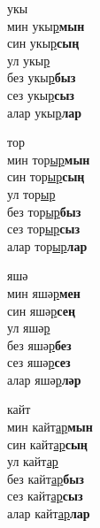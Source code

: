 \begin{multicols}{4}
\begin{enumerate}
\begin{minipage}{\linewidth}
    \item
    укы\\
    мин укы\underline{р}\textbf{мын}\\
    син укы\underline{р}\textbf{сың}\\
    ул укы\underline{р}\\
    без укы\underline{р}\textbf{быз}\\
    сез укы\underline{р}\textbf{сыз}\\
    алар укы\underline{р}\textbf{лар}\\
\end{minipage}

\begin{minipage}{\linewidth}
    \item
    тор\\
    мин тор\underline{ыр}\textbf{мын}\\
    син тор\underline{ыр}\textbf{сың}\\
    ул тор\underline{ыр}\\
    без тор\underline{ыр}\textbf{быз}\\
    сез тор\underline{ыр}\textbf{сыз}\\
    алар тор\underline{ыр}\textbf{лар}\\
\end{minipage}

\begin{minipage}{\linewidth}
    \item
    яшә\\
    мин яшә\underline{р}\textbf{мен}\\
    син яшә\underline{р}\textbf{сең}\\
    ул яшә\underline{р}\\
    без яшә\underline{р}\textbf{без}\\
    сез яшә\underline{р}\textbf{сез}\\
    алар яшә\underline{р}\textbf{ләр}\\
\end{minipage}

\begin{minipage}{\linewidth}
    \item
    кайт\\
    мин кайт\underline{ар}\textbf{мын}\\
    син кайт\underline{ар}\textbf{сың}\\
    ул кайт\underline{ар}\\
    без кайт\underline{ар}\textbf{быз}\\
    сез кайт\underline{ар}\textbf{сыз}\\
    алар кайт\underline{ар}\textbf{лар}\\
\end{minipage}


\end{enumerate}
\end{multicols}

